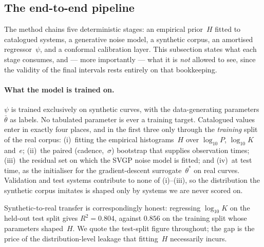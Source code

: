 %

\subsection{The end-to-end pipeline}
\label{sec:end-to-end}

The method chains five deterministic stages: an empirical prior~$H$ fitted to
catalogued systems, a generative noise model, a synthetic corpus, an amortised
regressor~$\psi$, and a conformal calibration layer.  This subsection states
what each stage consumes, and --- more importantly --- what it is \emph{not}
allowed to see, since the validity of the final intervals rests entirely on
that bookkeeping.

\paragraph{What the model is trained on.}
$\psi$ is trained exclusively on synthetic curves, with the data-generating
parameters~$\bar\theta$ as labels.  No tabulated parameter is ever a training
target.  Catalogued values enter in exactly four places, and in the first three
only through the \emph{training} split of the real corpus: (i)~fitting the
empirical histograms~$H$ over $\log_{10}P$, $\log_{10}K$ and~$e$; (ii)~the
paired (cadence,~$\sigma$) bootstrap that supplies observation times; (iii)~the
residual set on which the SVGP noise model is fitted; and (iv)~at test time, as
the initialiser for the gradient-descent surrogate~$\theta^\ast$ on real
curves.  Validation and test systems contribute to none of (i)--(iii), so the
distribution the synthetic corpus imitates is shaped only by systems we are
never scored on.

Synthetic-to-real transfer is correspondingly honest: regressing
$\log_{10}K$ on the held-out test split gives $R^2 = 0.804$, against $0.856$ on
the training split whose parameters shaped~$H$.  We quote the test-split figure
throughout; the gap is the price of the distribution-level leakage that
fitting~$H$ necessarily incurs.

